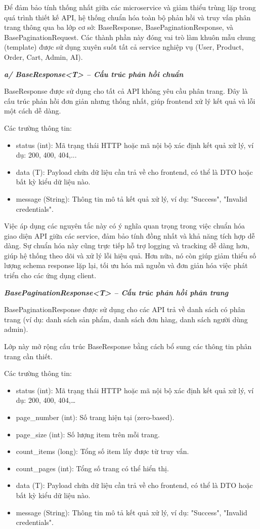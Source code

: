 Để đảm bảo tính thống nhất giữa các microservice và giảm thiểu trùng lặp trong quá trình thiết kế API, hệ thống chuẩn hóa toàn bộ phản hồi và truy vấn phân trang thông qua ba lớp cơ sở: BaseResponse, BasePaginationResponse, và BasePaginationRequest. Các thành phần này đóng vai trò làm khuôn mẫu chung (template) được sử dụng xuyên suốt tất cả service nghiệp vụ (User, Product, Order, Cart, Admin, AI).

\textbf{\textit{a/ BaseResponse<T> – Cấu trúc phản hồi chuẩn }}

BaseResponse được sử dụng cho tất cả API không yêu cầu phân trang. Đây là cấu trúc phản hồi đơn giản nhưng thống nhất, giúp frontend xử lý kết quả và lỗi một cách dễ dàng.

Các trường thông tin:

\begin{itemize}
    \item status (int): Mã trạng thái HTTP hoặc mã nội bộ xác định kết quả xử lý, ví dụ: 200, 400, 404,...
    \item data (T): Payload chứa dữ liệu cần trả về cho frontend, có thể là DTO hoặc bất kỳ kiểu dữ liệu nào.
    \item message (String): Thông tin mô tả kết quả xử lý, ví dụ: "Success", "Invalid credentials".
\end{itemize}

Việc áp dụng các nguyên tắc này có ý nghĩa quan trọng trong việc chuẩn hóa giao diện API giữa các service, đảm bảo tính đồng nhất và khả năng tích hợp dễ dàng. Sự chuẩn hóa này cũng trực tiếp hỗ trợ logging và tracking dễ dàng hơn, giúp hệ thống theo dõi và xử lý lỗi hiệu quả. Hơn nữa, nó còn giúp giảm thiểu số lượng schema response lặp lại, tối ưu hóa mã nguồn và đơn giản hóa việc phát triển cho các ứng dụng client.

\textbf{\textit{BasePaginationResponse<T> – Cấu trúc phản hồi phân trang}}

BasePaginationResponse được sử dụng cho các API trả về danh sách có phân trang (ví dụ: danh sách sản phẩm, danh sách đơn hàng, danh sách người dùng admin).

Lớp này mở rộng cấu trúc BaseResponse bằng cách bổ sung các thông tin phân trang cần thiết.

Các trường thông tin:

\begin{itemize}
    \item status (int): Mã trạng thái HTTP hoặc mã nội bộ xác định kết quả xử lý, ví dụ: 200, 400, 404,\dots
    \item page\_number (int): Số trang hiện tại (zero-based).
    \item page\_size (int): Số lượng item trên mỗi trang.
    \item count\_items (long): Tổng số item lấy được từ truy vấn.
    \item count\_pages (int): Tổng số trang có thể hiển thị.
    \item data (T): Payload chứa dữ liệu cần trả về cho frontend, có thể là DTO hoặc bất kỳ kiểu dữ liệu nào.
    \item message (String): Thông tin mô tả kết quả xử lý, ví dụ: "Success", "Invalid credentials".
\end{itemize}

